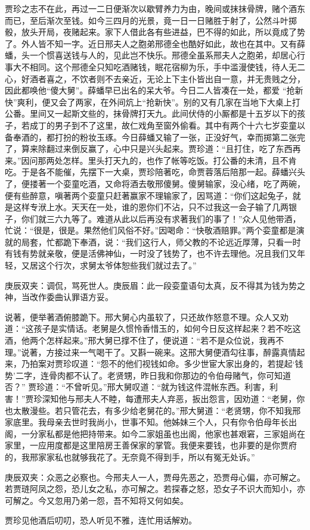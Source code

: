 \begin{parag}
    贾珍之志不在此，再过一二日便渐次以歇臂养力为由，晚间或抹抹骨牌，赌个酒东而已，至后渐次至钱。如今三四月的光景，竟一日一日赌胜于射了，公然斗叶掷骰，放头开局，夜赌起来。家下人借此各有些进益，巴不得的如此，所以竟成了势了。外人皆不知一字。近日邢夫人之胞弟邢德全也酷好如此，故也在其中。又有薛蟠，头一个惯喜送钱与人的，见此岂不快乐。邢德全虽系邢夫人之胞弟，却居心行事大不相同。这个邢德全只知吃酒赌钱，眠花宿柳为乐，手中滥漫使钱，待人无二心，好酒者喜之，不饮者则不去亲近，无论上下主仆皆出自一意，并无贵贱之分，因此都唤他“傻大舅”。薛蟠早已出名的呆大爷。今日二人皆凑在一处，都爱 “抢新快”爽利，便又会了两家，在外间炕上“抢新快”。别的又有几家在当地下大桌上打公番。里间又一起斯文些的，抹骨牌打天九。此间伏侍的小厮都是十五岁以下的孩子，若成丁的男子到不了这里，故仁戏角至窗外偷看。其中有两个十六七岁娈童以备奉酒的，都打扮的粉妆玉琢。今日薛蟠又输了一张，正没好气，幸而掷第二张完了，算来除翻过来倒反赢了，心中只是兴头起来。贾珍道：“且打住，吃了东西再来。”因问那两处怎样。里头打天九的，也作了帐等吃饭。打公番的未清，且不肯吃。于是各不能催，先摆下一大桌，贾珍陪著吃，命贾蓉落后陪那一起。薛蟠兴头了，便搂著一个娈童吃酒，又命将酒去敬邢傻舅。傻舅输家，没心绪，吃了两碗，便有些醉意，嗔著两个娈童只赶著赢家不理输家了，因骂道：“你们这起兔子，就是这样专洑上水。天天在一处，谁的恩你们不沾，只不过我这一会子输了几两银子，你们就三六九等了。难道从此以后再没有求著我们的事了！”众人见他带酒，忙说：“很是，很是。果然他们风俗不好。”因喝命：“快敬酒赔罪。”两个娈童都是演就的局套，忙都跪下奉酒，说：“我们这行人，师父教的不论远近厚薄，只看一时有钱有势就亲敬，便是活佛神仙，一时没了钱势了，也不许去理他。况且我们又年轻，又居这个行次，求舅太爷体恕些我们就过去了。”\begin{note}庚辰双夹：调侃，骂死世人。庚辰眉：此一段娈童语句太真，反不得其为钱为势之神，当改作委曲认罪语方妥。\end{note}说著，便举著酒俯膝跪下。邢大舅心内虽软了，只还故作怒意不理。众人又劝道：“这孩子是实情话。老舅是久惯怜香惜玉的，如何今日反这样起来？若不吃这酒，他两个怎样起来。”邢大舅已撑不住了，便说道：“若不是众位说，我再不理。”说著，方接过来一气喝干了。又斟一碗来。这邢大舅便酒勾往事，醉露真情起来，乃拍案对贾珍叹道：“怨不的他们视钱如命。多少世宦大家出身的，若提起‘钱势’二字，连骨肉都不认了。老贤甥，昨日我和你那边的令伯母赌气，你可知道否？” 贾珍道：“不曾听见。”邢大舅叹道：“就为钱这件混帐东西。利害，利害！”贾珍深知他与邢夫人不睦，每遭邢夫人弃恶，扳出怨言，因劝道：“老舅，你也太散漫些。若只管花去，有多少给老舅花的。”邢大舅道：“老贤甥，你不知我邢家底里。我母亲去世时我尚小，世事不知。他姊妹三个人，只有你令伯母年长出阁，一分家私都是他把持带来。如今二家姐虽也出阁，他家也甚艰窘，三家姐尚在家里，一应用度都是这里陪房王善保家的掌管。我便来要钱，也非要的是你贾府的，我邢家家私也就够我花了。无奈竟不得到手，所以有冤无处诉。”\begin{note}庚辰双夹：众恶之必察也。今邢夫人一人，贾母先恶之，恐贾母心偏，亦可解之。若贾琏阿凤之怨，恐儿女之私，亦可解之。若探春之怒，恐女子不识大而知小，亦可解之。今又忽用乃弟一怨，吾不知将又何如矣。\end{note}贾珍见他酒后叨叨，恐人听见不雅，连忙用话解劝。
\end{parag}


